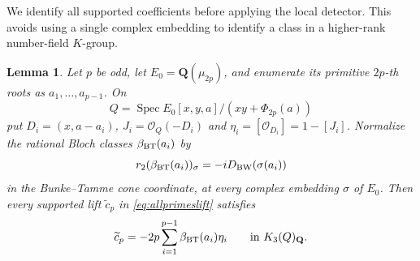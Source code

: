 \documentclass[11pt,a4paper]{article}
\newtheorem{lemma}[theorem]{Lemma}
\theoremstyle{remark}
\newcommand{\Q}{\mathbf Q}
\newcommand{\OO}{\mathcal O}
\newcommand{\Spec}{\operatorname{Spec}}
\begin{document}
We identify all supported coefficients before applying the local
detector. This avoids using a single complex embedding to identify
a class in a higher-rank number-field $K$-group.

\begin{lemma}\label{lem:explicitoddcoefficients}
Let $p$ be odd, let $E_0=\Q(\mu_{2p})$, and enumerate its primitive
$2p$-th roots as $a_1,\ldots,a_{p-1}$. On
\[
 Q=\Spec E_0[x,y,a]/(xy+\Phi_{2p}(a))
\]
put $D_i=(x,a-a_i)$, $J_i=\OO_Q(-D_i)$ and
$\eta_i=[\OO_{D_i}]=1-[J_i]$.
Normalize the rational Bloch classes $\beta_{\rm BT}(a_i)$ by
\[
 r_2(\beta_{\rm BT}(a_i))_\sigma
   =-iD_{\rm BW}(\sigma(a_i))
\]
in the Bunke--Tamme cone coordinate, at every complex embedding
$\sigma$ of $E_0$.
Then every supported lift $\widetilde c_p$ in
\eqref{eq:allprimeslift} satisfies
\begin{equation}\label{eq:explicitoddcoefficient}
 \widetilde c_p=-2p\sum_{i=1}^{p-1}\beta_{\rm BT}(a_i)\eta_i
 \qquad\text{in }K_3(Q)_{\Q}.
\end{equation}
\end{lemma}
\end{document}
